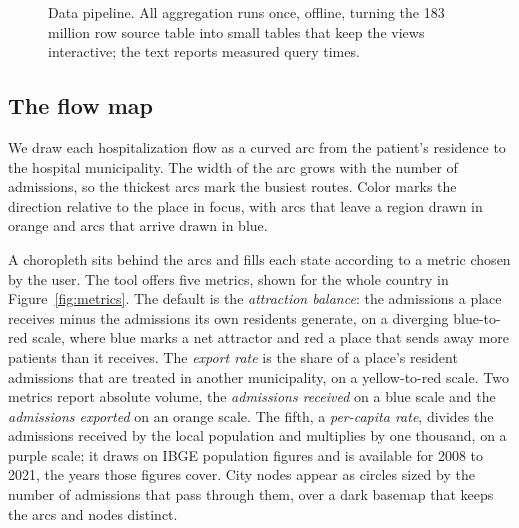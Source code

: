 \begin{figure}[tbp]
  \centering
  \caption{%
    Data pipeline.
    All aggregation runs once, offline, turning the 183 million row source table into small tables that keep the views interactive; the text reports measured query times.%
  }
  \label{fig:architecture}
\end{figure}

\subsection{The flow map}

We draw each hospitalization flow as a curved arc from the patient's residence to the hospital municipality.
The width of the arc grows with the number of admissions, so the thickest arcs mark the busiest routes.
Color marks the direction relative to the place in focus, with arcs that leave a region drawn in orange and arcs that arrive drawn in blue.

A choropleth sits behind the arcs and fills each state according to a metric chosen by the user.
The tool offers five metrics, shown for the whole country in Figure~\ref{fig:metrics}.
The default is the \emph{attraction balance}: the admissions a place receives minus the admissions its own residents generate, on a diverging blue-to-red scale, where blue marks a net attractor and red a place that sends away more patients than it receives.
The \emph{export rate} is the share of a place's resident admissions that are treated in another municipality, on a yellow-to-red scale.
Two metrics report absolute volume, the \emph{admissions received} on a blue scale and the \emph{admissions exported} on an orange scale.
The fifth, a \emph{per-capita rate}, divides the admissions received by the local population and multiplies by one thousand, on a purple scale; it draws on IBGE population figures and is available for 2008 to 2021, the years those figures cover.
City nodes appear as circles sized by the number of admissions that pass through them, over a dark basemap that keeps the arcs and nodes distinct.

